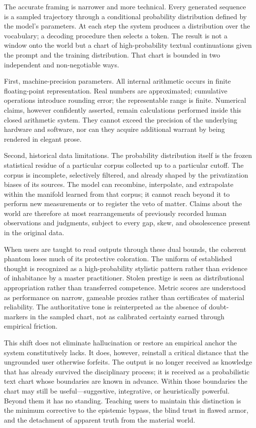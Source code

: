 The accurate framing is narrower and more technical. Every generated sequence is a sampled trajectory through a conditional probability distribution defined by the model’s parameters. At each step the system produces a distribution over the vocabulary; a decoding procedure then selects a token. The result is not a window onto the world but a chart of high-probability textual continuations given the prompt and the training distribution. That chart is bounded in two independent and non-negotiable ways.

First, machine-precision parameters. All internal arithmetic occurs in finite floating-point representation. Real numbers are approximated; cumulative operations introduce rounding error; the representable range is finite. Numerical claims, however confidently asserted, remain calculations performed inside this closed arithmetic system. They cannot exceed the precision of the underlying hardware and software, nor can they acquire additional warrant by being rendered in elegant prose.

Second, historical data limitations. The probability distribution itself is the frozen statistical residue of a particular corpus collected up to a particular cutoff. The corpus is incomplete, selectively filtered, and already shaped by the privatization biases of its sources. The model can recombine, interpolate, and extrapolate within the manifold learned from that corpus; it cannot reach beyond it to perform new measurements or to register the veto of matter. Claims about the world are therefore at most rearrangements of previously recorded human observations and judgments, subject to every gap, skew, and obsolescence present in the original data.

When users are taught to read outputs through these dual bounds, the coherent phantom loses much of its protective coloration. The uniform of established thought is recognized as a high-probability stylistic pattern rather than evidence of inhabitance by a master practitioner. Stolen prestige is seen as distributional appropriation rather than transferred competence. Metric scores are understood as performance on narrow, gameable proxies rather than certificates of material reliability. The authoritative tone is reinterpreted as the absence of doubt-markers in the sampled chart, not as calibrated certainty earned through empirical friction.

This shift does not eliminate hallucination or restore an empirical anchor the system constitutively lacks. It does, however, reinstall a critical distance that the ungrounded user otherwise forfeits. The output is no longer received as knowledge that has already survived the disciplinary process; it is received as a probabilistic text chart whose boundaries are known in advance. Within those boundaries the chart may still be useful—suggestive, integrative, or heuristically powerful. Beyond them it has no standing. Teaching users to maintain this distinction is the minimum corrective to the epistemic bypass, the blind trust in flawed armor, and the detachment of apparent truth from the material world.

